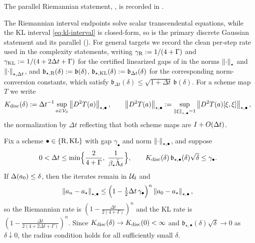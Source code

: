The parallel Riemannian statement, , is recorded in
.

The Riemannian interval endpoints solve scalar transcendental equations, while the KL interval
\eqref{eq:kl-interval} is closed-form, so  is the primary discrete
Gaussian statement and  its parallel (). For general targets we record
the clean per-step rate used in the complexity statements, writing
$\gamma_{\mathrm{R}}:=1/(4+\Gamma)$ and $\gamma_{\mathrm{KL}}:=1/(4+2\Delta t+\Gamma)$ for the certified
linearized gaps of  in the norms $\left\lVert \cdot\right\rVert_\star$ and
$\left\lVert \cdot\right\rVert_{\star,\Delta t}$, and
$\mathfrak b_{\star,\mathrm{R}}(\delta):=\mathfrak b(\delta)$,
$\mathfrak b_{\star,\mathrm{KL}}(\delta):=\mathfrak b_{\Delta t}(\delta)$ for the corresponding
norm-conversion constants, which satisfy
$\mathfrak b_{\Delta t}(\delta)\leq\sqrt{1+\Delta t}\,\mathfrak b(\delta)$. For a scheme map $T$
we write
\begin{equation}
\label{eq:Kdisc}
    K_{\mathrm{disc}}(\delta):=\Delta t^{-1}\sup_{a\in\mathcal V_\delta}\left\lVert D^2T(a)\right\rVert_{\star,\bullet},
    \qquad
    \left\lVert D^2T(a)\right\rVert_{\star,\bullet}:=\sup_{\left\lVert \xi\right\rVert_{\star,\bullet}=1}\left\lVert D^2T(a)[\xi,\xi]\right\rVert_{\star,\bullet},
\end{equation}
the normalization by $\Delta t$ reflecting that both scheme maps are $I+O(\Delta t)$.

\begin{theorem}
\label{thm:loc-disc}
Fix a scheme $\bullet\in\{\mathrm{R},\mathrm{KL}\}$ with gap $\gamma_\bullet$ and norm
$\left\lVert \cdot\right\rVert_{\star,\bullet}$, and suppose
\[
    0<\Delta t\leq\min\Bigl\{\frac2{4+\Gamma},\;\frac1{\beta_\star\bar\Lambda_\delta}\Bigr\},
    \qquad
    K_{\mathrm{disc}}(\delta)\,\mathfrak b_{\star,\bullet}(\delta)\sqrt\delta\leq\gamma_\bullet .
\]
If $\Delta(a_0)\leq\delta$, then the iterates remain in $\mathcal{U}_\delta$ and
\[
    \left\lVert a_n-a_\star\right\rVert_{\star,\bullet}
    \leq\Bigl(1-\tfrac12\Delta t\,\gamma_\bullet\Bigr)^n\left\lVert a_0-a_\star\right\rVert_{\star,\bullet},
\]
so the Riemannian rate is $(1-\tfrac{\Delta t}{2(4+\Gamma)})^n$ and the KL rate is
$(1-\tfrac{\Delta t}{2(4+2\Delta t+\Gamma)})^n$. Since $K_{\mathrm{disc}}(\delta)\to K_{\mathrm{disc}}(0)<\infty$ and
$\mathfrak b_{\star,\bullet}(\delta)\sqrt\delta\to0$ as $\delta\downarrow0$, the radius
condition holds for all sufficiently small $\delta$.
\end{theorem}

